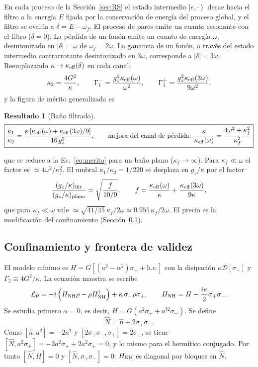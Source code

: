 \documentclass[11pt,a4paper]{article}
\newcommand{\ket}[1]{\left|#1\right\rangle}
\newcommand{\spl}{\sigma_{+}}
\newcommand{\smi}{\sigma_{-}}
\newcommand{\D}{\mathcal{D}}
\newcommand{\Lv}{\mathcal{L}}
\newcommand{\hn}{\hat n}
\theoremstyle{definition}
\newtheorem{resultado}{Resultado}
\begin{document}
En cada proceso de la Sección~\ref{sec:RS} el estado intermedio $\ket{e,\cdot}$ decae hacia el filtro a la energía $E$ fijada por la conservación de energía del proceso global, y el filtro se evalúa a $\delta=E-\omega_f$. El proceso de pares emite un cuanto resonante con el filtro ($\delta=0$). La pérdida de un fonón emite un cuanto de energía $\omega$, desintonizado en $|\delta|=\omega$ de $\omega_f=2\omega$. La ganancia de un fonón, a través del estado intermedio contrarrotante desintonizado en $3\omega$, corresponde a $|\delta|=3\omega$. Reemplazando $\kappa\to\kappa_{\rm eff}(\delta)$ en cada canal:
\begin{equation}
\kappa_2=\frac{4G^2}{\kappa},\qquad
\Gamma_1^{-}=\frac{g_x^2\kappa_{\rm eff}(\omega)}{\omega^2},\qquad
\Gamma_1^{+}=\frac{g_x^2\kappa_{\rm eff}(3\omega)}{9\omega^2},
\end{equation}
y la figura de mérito generalizada es
\begin{resultado}[Baño filtrado]
\begin{equation}
\boxed{\frac{\kappa_1}{\kappa_2}=\frac{\kappa\left[\kappa_{\rm eff}(\omega)+\kappa_{\rm eff}(3\omega)/9\right]}{16\,g_z^2},\qquad\text{mejora del canal de pérdida:}\ \frac{\kappa}{\kappa_{\rm eff}(\omega)}=\frac{4\omega^2+\kappa_f^2}{\kappa_f^2}}
\label{eq:merito_f}
\end{equation}
\end{resultado}
que se reduce a la Ec.~\eqref{eq:merito} para un baño plano ($\kappa_f\to\infty$). Para $\kappa_f\ll\omega$ el factor es $\simeq4\omega^2/\kappa_f^2$. El umbral $\kappa_1/\kappa_2=1/220$ se desplaza en $g_z/\kappa$ por el factor
\begin{equation}
\frac{(g_z/\kappa)_{\rm filt}}{(g_z/\kappa)_{\rm plano}}=\sqrt{\frac{f}{10/9}},\qquad f=\frac{\kappa_{\rm eff}(\omega)}{\kappa}+\frac{\kappa_{\rm eff}(3\omega)}{9\kappa},
\end{equation}
que para $\kappa_f\ll\omega$ vale $\simeq\sqrt{41/45}\,\kappa_f/2\omega\simeq0.955\,\kappa_f/2\omega$. El precio es la modificación del confinamiento (Sección~\ref{sec:conf}).

\subsection{Confinamiento y frontera de validez}
\label{sec:conf}


El modelo mínimo es $H=G[(a^2-\alpha^2)\spl+\mathrm{h.c.}]$ con la disipación $\kappa\D[\smi]$ y $\Gamma_2\equiv4G^2/\kappa$. La ecuación maestra se escribe
\begin{equation}
\Lv\rho=-i\left(H_{\rm NH}\rho-\rho H_{\rm NH}^{\dagger}\right)+\kappa\,\smi\rho\spl,\qquad H_{\rm NH}=H-\frac{i\kappa}{2}\spl\smi.
\end{equation}
Se estudia primero $\alpha=0$, es decir, $H=G(a^2\spl+a^{\dagger2}\smi)$. Se define
\begin{equation}
\hat N=\hn+2\spl\smi.
\end{equation}
Como $[\hn,a^2]=-2a^2$ y $[2\spl\smi,\spl]=2\spl$, se tiene $[\hat N,a^2\spl]=-2a^2\spl+2a^2\spl=0$, y lo mismo para el hermítico conjugado. Por tanto $[\hat N,H]=0$ y $[\hat N,\spl\smi]=0$: $H_{\rm NH}$ es diagonal por bloques en $\hat N$.
\end{document}
